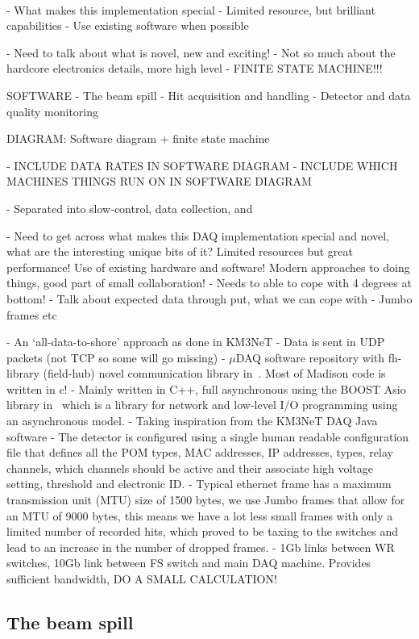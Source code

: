 ~\cite{chipsdaq2020}

- What makes this implementation special
- Limited resource, but brilliant capabilities
- Use existing software when possible

- Need to talk about what is novel, new and exciting!
- Not so much about the hardcore electronics details, more high level
- FINITE STATE MACHINE!!!

SOFTWARE
- The beam spill
- Hit acquisition and handling
- Detector and data quality monitoring

DIAGRAM: Software diagram + finite state machine

- INCLUDE DATA RATES IN SOFTWARE DIAGRAM
- INCLUDE WHICH MACHINES THINGS RUN ON IN SOFTWARE DIAGRAM

- Separated into slow-control, data collection, and

- Need to get across what makes this DAQ implementation special and novel, what are the
interesting unique bits of it? Limited resources but great performance! Use of existing hardware
and software! Modern approaches to doing things, good part of small collaboration!
- Needs to able to cope with 4 degrees at bottom!
- Talk about expected data through put, what we can cope with
- Jumbo frames etc

- An `all-data-to-shore' approach as done in KM3NeT
- Data is sent in UDP packets (not TCP so some will go missing)
- $\mu$DAQ software repository with fh-library (field-hub) novel communication library
in~\cite{microdaq2020}. Most of Madison code is written in c!
- Mainly written in C++, full asynchronous using the BOOST Asio library in~\cite{boost2020} which
is a library for network and low-level I/O programming using an asynchronous model.
- Taking inspiration from the KM3NeT DAQ Java software
- The detector is configured using a single human readable configuration file that defines all the
POM types, MAC addresses, IP addresses, types, relay channels, which channels should be active and
their associate high voltage setting, threshold and electronic ID.
- Typical ethernet frame has a maximum transmission unit (MTU) size of 1500 bytes, we use Jumbo
frames that allow for an MTU of 9000 bytes, this means we have a lot less small frames with only a
limited number of recorded hits, which proved to be taxing to the switches and lead to an increase
in the number of dropped frames.
- 1Gb links between WR switches, 10Gb link between FS switch and main DAQ machine. Provides
sufficient bandwidth, DO A SMALL CALCULATION!

\subsection{The beam spill} %
\label{sec:daq_soft_spill} %

